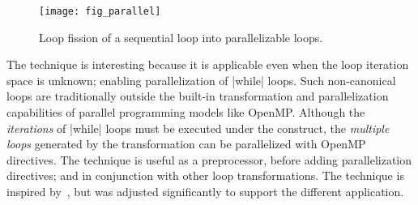 \begin{figure}[h]
{\centering\texttt{[image: fig\_parallel]}}
\caption[Loop fission transformation]
{Loop fission of a sequential loop into parallelizable loops.}\label{fig:icc-fission}
\end{figure}

The technique is interesting because it is applicable even when the loop iteration space is unknown;
enabling parallelization of \eg \pr|while| loops.
Such non-canonical loops are traditionally outside the built-in transformation and parallelization capabilities of parallel programming models like OpenMP\@.
Although the \emph{iterations} of \pr|while| loops must be executed under the  construct,
the \emph{multiple loops} generated by the transformation can be parallelized with OpenMP directives.
The technique is useful as a preprocessor, before adding parallelization directives;
and in conjunction with other loop transformations.
The technique is inspired by~\cite{moyen20172}, but was adjusted significantly to support the different application.
